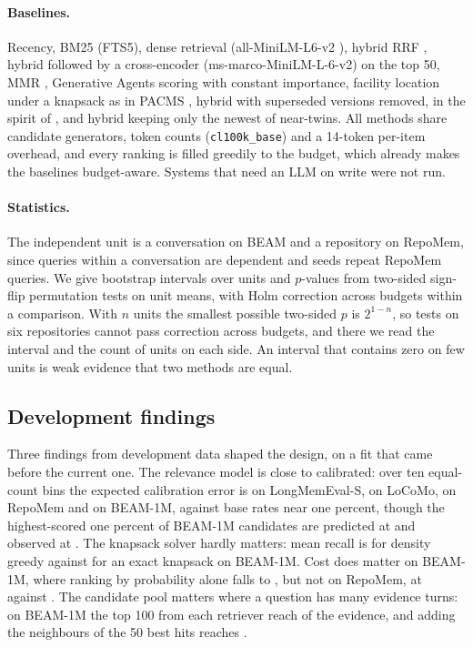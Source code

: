 \paragraph{Baselines.} Recency, BM25 (FTS5), dense retrieval (all-MiniLM-L6-v2 \cite{hf_minilm}), hybrid RRF \cite{cormack2009rrf}, hybrid followed by a cross-encoder (ms-marco-MiniLM-L-6-v2) on the top 50, MMR \cite{carbonell1998mmr}, Generative Agents scoring \cite{park2023generative} with constant importance, facility location under a knapsack as in PACMS \cite{pacms2026}, hybrid with superseded versions removed, in the spirit of \cite{rasmussen2025zep}, and hybrid keeping only the newest of near-twins. All methods share candidate generators, token counts (\texttt{cl100k\_base}) and a 14-token per-item overhead, and every ranking is filled greedily to the budget, which already makes the baselines budget-aware. Systems that need an LLM on write were not run.

\paragraph{Statistics.} The independent unit is a conversation on BEAM and a repository on RepoMem, since queries within a conversation are dependent and seeds repeat RepoMem queries. We give bootstrap intervals over units and $p$-values from two-sided sign-flip permutation tests on unit means, with Holm correction across budgets within a comparison. With $n$ units the smallest possible two-sided $p$ is $2^{1-n}$, so tests on six repositories cannot pass correction across budgets, and there we read the interval and the count of units on each side. An interval that contains zero on few units is weak evidence that two methods are equal.

\subsection{Development findings}\label{sec:dev}
Three findings from development data shaped the design, on a fit that came before the current one. The relevance model is close to calibrated: over ten equal-count bins the expected calibration error is  on LongMemEval-S,  on LoCoMo,  on RepoMem and  on BEAM-1M, against base rates near one percent, though the highest-scored one percent of BEAM-1M candidates are predicted at  and observed at . The knapsack solver hardly matters: mean recall is  for density greedy against  for an exact knapsack on BEAM-1M. Cost does matter on BEAM-1M, where ranking by probability alone falls to , but not on RepoMem, at  against . The candidate pool matters where a question has many evidence turns: on BEAM-1M the top 100 from each retriever reach  of the evidence, and adding the neighbours of the 50 best hits reaches .

